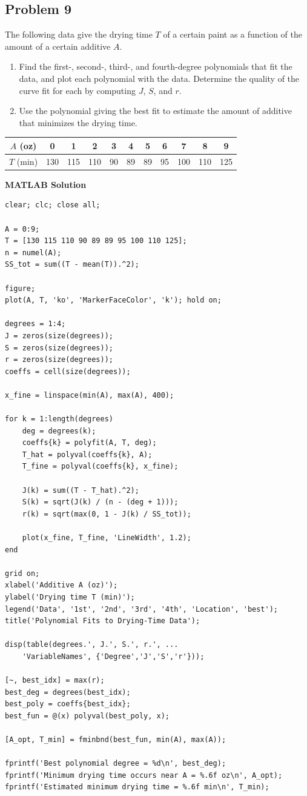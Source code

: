 \documentclass[12pt]{article}
\newcommand{\questiontitle}[2]{%
    \phantomsection
    \hypertarget{#1}{}%
    \subsection*{#2}
}
\newcommand{\solutiontitle}{\noindent\textbf{MATLAB Solution}}
\begin{document}
\questiontitle{tut6-q9}{Problem 9}
The following data give the drying time $T$ of a certain paint as a function of the amount of a certain additive $A$.
\begin{enumerate}[label=\alph*.]
    \item Find the first-, second-, third-, and fourth-degree polynomials that fit the data, and plot each polynomial with the data. Determine the quality of the curve fit for each by computing $J$, $S$, and $r$.
    \item Use the polynomial giving the best fit to estimate the amount of additive that minimizes the drying time.
\end{enumerate}

\begin{center}
\begin{tabular}{ccccccccccc}
\toprule
$A$ (oz) & 0 & 1 & 2 & 3 & 4 & 5 & 6 & 7 & 8 & 9 \\
\midrule
$T$ (min) & 130 & 115 & 110 & 90 & 89 & 89 & 95 & 100 & 110 & 125 \\
\bottomrule
\end{tabular}
\end{center}

\solutiontitle
\begin{lstlisting}
clear; clc; close all;

A = 0:9;
T = [130 115 110 90 89 89 95 100 110 125];
n = numel(A);
SS_tot = sum((T - mean(T)).^2);

figure;
plot(A, T, 'ko', 'MarkerFaceColor', 'k'); hold on;

degrees = 1:4;
J = zeros(size(degrees));
S = zeros(size(degrees));
r = zeros(size(degrees));
coeffs = cell(size(degrees));

x_fine = linspace(min(A), max(A), 400);

for k = 1:length(degrees)
    deg = degrees(k);
    coeffs{k} = polyfit(A, T, deg);
    T_hat = polyval(coeffs{k}, A);
    T_fine = polyval(coeffs{k}, x_fine);

    J(k) = sum((T - T_hat).^2);
    S(k) = sqrt(J(k) / (n - (deg + 1)));
    r(k) = sqrt(max(0, 1 - J(k) / SS_tot));

    plot(x_fine, T_fine, 'LineWidth', 1.2);
end

grid on;
xlabel('Additive A (oz)');
ylabel('Drying time T (min)');
legend('Data', '1st', '2nd', '3rd', '4th', 'Location', 'best');
title('Polynomial Fits to Drying-Time Data');

disp(table(degrees.', J.', S.', r.', ...
    'VariableNames', {'Degree','J','S','r'}));

[~, best_idx] = max(r);
best_deg = degrees(best_idx);
best_poly = coeffs{best_idx};
best_fun = @(x) polyval(best_poly, x);

[A_opt, T_min] = fminbnd(best_fun, min(A), max(A));

fprintf('Best polynomial degree = %d\n', best_deg);
fprintf('Minimum drying time occurs near A = %.6f oz\n', A_opt);
fprintf('Estimated minimum drying time = %.6f min\n', T_min);
\end{lstlisting}
\end{document}
